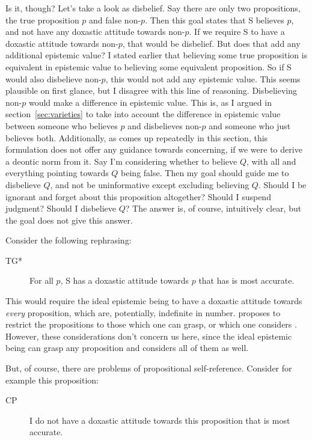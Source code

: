 \documentclass[12pt,numbers=noenddot]{scrartcl}
\begin{document}
Is it, though? Let's take a look as disbelief. Say there are only two propositions, the true proposition $p$ and false non-$p$. Then this goal states that S believes $p$, and not have any doxastic attitude towards non-$p$. If we require S to have a doxastic attitude towards non-$p$, that would be disbelief. But does that add any additional epistemic value? I stated earlier that believing some true proposition is equivalent in epistemic value to believing some equivalent proposition. So if S would also disbelieve non-$p$, this would not add any epistemic value. This seems plausible on first glance, but I disagree with this line of reasoning. Disbelieving non-$p$ would make a difference in epistemic value. This is, as I argued in section \ref{sec:varieties} to take into account the difference in epistemic value between someone who believes $p$ and disbelieves non-$p$ and someone who just believes both. Additionally, as comes up repeatedly in this section, this formulation does not offer any guidance towards concerning, if we were to derive a deontic norm from it. Say I'm considering whether to believe $Q$, with all and everything pointing towards $Q$ being false. Then my goal should guide me to disbelieve $Q$, and not be uninformative except excluding believing $Q$. Should I be ignorant and forget about this proposition altogether? Should I suspend judgment? Should I disbelieve $Q$? The answer is, of course, intuitively clear, but the goal does not give this answer. 

Consider the following rephrasing:

\begin{description}
    \item[TG*] For all $p$, S has a doxastic attitude towards $p$ that has is most accurate.
\end{description}

This would require the ideal epistemic being to have a doxastic attitude towards \emph{every} proposition, which are, potentially, indefinite in number. \textcite[159]{David2001-DAVTAT-7} proposes to restrict the propositions to those which one can grasp, or which one considers \autocite[17]{Chisholm1966-CHITOK}. However, these considerations don't concern us here, since the ideal epistemic being can grasp any proposition and considers all of them as well.

But, of course, there are problems of propositional self-reference. Consider for example this proposition:
\begin{description}
    \item[CP] I do not have a doxastic attitude towards this proposition that is most accurate.
\end{description}
\end{document}
